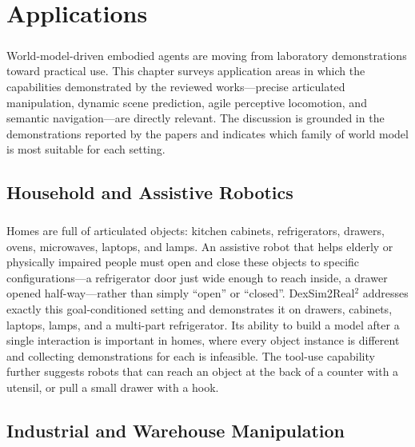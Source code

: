 \documentclass[12pt,a4paper,final]{extreport}
\begin{document}
\chapter{Applications}

\paragraph{} World-model-driven embodied agents are moving from laboratory demonstrations toward practical use. This chapter surveys application areas in which the capabilities demonstrated by the reviewed works---precise articulated manipulation, dynamic scene prediction, agile perceptive locomotion, and semantic navigation---are directly relevant. The discussion is grounded in the demonstrations reported by the papers and indicates which family of world model is most suitable for each setting.

\section{Household and Assistive Robotics}

\paragraph{} Homes are full of articulated objects: kitchen cabinets, refrigerators, drawers, ovens, microwaves, laptops, and lamps. An assistive robot that helps elderly or physically impaired people must open and close these objects to specific configurations---a refrigerator door just wide enough to reach inside, a drawer opened half-way---rather than simply ``open'' or ``closed''. DexSim2Real$^2$ addresses exactly this goal-conditioned setting and demonstrates it on drawers, cabinets, laptops, lamps, and a multi-part refrigerator. Its ability to build a model after a single interaction is important in homes, where every object instance is different and collecting demonstrations for each is infeasible. The tool-use capability further suggests robots that can reach an object at the back of a counter with a utensil, or pull a small drawer with a hook.

\section{Industrial and Warehouse Manipulation}
\end{document}
